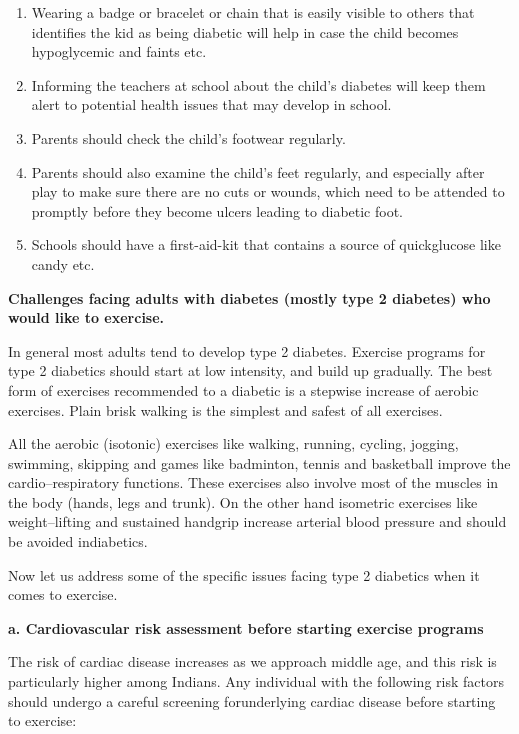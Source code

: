 \vspace{-\topsep}
\begin{enumerate}[•]
\itemsep=0pt
\item Wearing a badge or bracelet or chain that is easily visible to others that identifies the kid as being diabetic will help in case the child becomes hypoglycemic and faints etc.
\item Informing the teachers at school about the child’s diabetes will keep them alert to potential health issues that may develop in school.
\item Parents should check the child’s footwear regularly.
\item Parents should also examine the child’s feet regularly, and especially after play to make sure there are no cuts or wounds, which need to be attended to promptly before they become ulcers leading to diabetic foot.
\item Schools should have a first-aid-kit that contains a source of quick\break glucose like candy etc.
\end{enumerate}
\vspace{-\topsep}

\noindent\textbf{Challenges facing adults with diabetes (mostly type 2 diabetes) who would like to exercise.}

In general most adults tend to develop type 2 diabetes. Exercise programs for type 2 diabetics should start at low intensity, and build up gradually. The best form of exercises recommended to a diabetic is a stepwise increase of aerobic exercises. Plain brisk walking is the simplest and safest of all exercises.

All the aerobic (isotonic) exercises like walking, running, cycling, jogging, swimming, skipping and games like badminton, tennis and basketball improve the cardio–respiratory functions. These exercises also involve most of the muscles in the body (hands, legs and trunk). On the other hand isometric exercises like weight–lifting and sustained handgrip increase arterial blood pressure and should be avoided in\break diabetics.

Now let us address some of the specific issues facing type 2 dia\-betics when it comes to exercise.

\noindent\textbf{a. Cardiovascular risk assessment before starting exercise programs}

The risk of cardiac disease increases as we approach middle age, and this risk is particularly higher among Indians. Any individual with the following risk factors should undergo a careful screening for\break underlying cardiac disease before starting to exercise:

